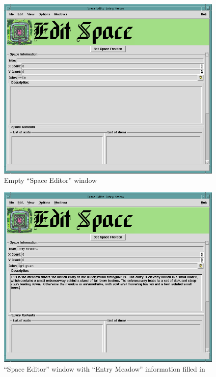 \begin{figure}[hbpt]
\begin{centering}
\includegraphics[width=5in]{NewEntryMeadowSpace.png}
\caption{Empty ``Space Editor'' window}
\label{fig:emptyspaceeditor}
\end{centering}
\end{figure}
\begin{figure}[hbpt]
\begin{centering}
\includegraphics[width=5in]{EntryMeadowSpaceBasicInformation.png}
\caption{``Space Editor'' window with ``Entry Meadow'' information
filled in}
\label{fig:entrymeadowspaceeditor1}
\end{centering}
\end{figure}
